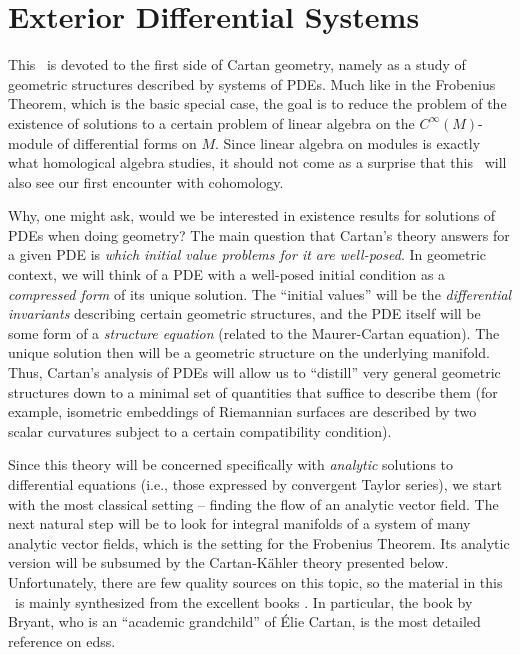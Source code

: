 \clearpage
\chapter{Exterior Differential Systems}\label{chap: EDSs}


This \chap\ is devoted to the first side of Cartan geometry, namely as a study of geometric structures described by systems of PDEs.
Much like in the Frobenius Theorem, which is the basic special case, the goal is to reduce the problem of the existence of solutions to a certain problem of linear algebra on the $C^\infty(M)$-module of differential forms on $M$. Since linear algebra on modules is exactly what homological algebra studies, it should not come as a surprise that this \chap\ will also see our first encounter with cohomology.

Why, one might ask, would we be interested in existence results for solutions of PDEs when doing geometry? The main question that Cartan's theory answers for a given PDE is \emph{which initial value problems for it are well-posed}. In geometric context, we will think of a PDE with a well-posed initial condition as a \emph{compressed form} of its unique solution. The ``initial values'' will be the \emph{differential invariants} describing certain geometric structures, and the PDE itself will be some form of a \emph{structure equation} (related to the Maurer-Cartan equation). The unique solution then will be a geometric structure on the underlying manifold. Thus, Cartan's analysis of PDEs will allow us to ``distill'' very general geometric structures down to a minimal set of quantities that suffice to describe them (for example, isometric embeddings of Riemannian surfaces are described by two scalar curvatures subject to a certain compatibility condition).

Since this theory will be concerned specifically with \emph{analytic} solutions to differential equations (i.e., those expressed by convergent Taylor series), we start with the most classical setting -- finding the flow of an analytic vector field. The next natural step will be to look for integral manifolds of a system of many analytic vector fields, which is the setting for the Frobenius Theorem. Its analytic version will be subsumed by the Cartan-K\"ahler theory presented below. Unfortunately, there are few quality sources on this topic, so the material in this \chap\ is mainly synthesized from the excellent books \cite{Bryant,Ivey,McKayEDS}. In particular, the book by Bryant, who is an ``academic grandchild'' of \'Elie Cartan, is the most detailed reference on \glspl{eds}.




